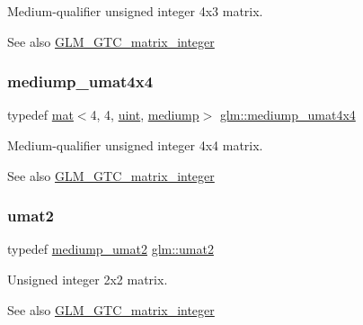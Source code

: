 Medium-\/qualifier unsigned integer 4x3 matrix. \begin{DoxySeeAlso}{See also}
\hyperlink{group__gtc__matrix__integer}{G\+L\+M\+\_\+\+G\+T\+C\+\_\+matrix\+\_\+integer} 
\end{DoxySeeAlso}
\mbox{\label{group__gtc__matrix__integer_ga0dcca70aa643639489cf52acf7574e6c}} 
\subsubsection{\texorpdfstring{mediump\+\_\+umat4x4}{mediump\_umat4x4}}
{\footnotesize\ttfamily typedef \hyperlink{structglm_1_1mat}{mat}$<$4, 4, \hyperlink{group__core__precision_ga4fd29415871152bfb5abd588334147c8}{uint}, \hyperlink{namespaceglm_a36ed105b07c7746804d7fdc7cc90ff25a6416f3ea0c9025fb21ed50c4d6620482}{mediump}$>$ \hyperlink{group__gtc__matrix__integer_ga0dcca70aa643639489cf52acf7574e6c}{glm\+::mediump\+\_\+umat4x4}}

Medium-\/qualifier unsigned integer 4x4 matrix. \begin{DoxySeeAlso}{See also}
\hyperlink{group__gtc__matrix__integer}{G\+L\+M\+\_\+\+G\+T\+C\+\_\+matrix\+\_\+integer} 
\end{DoxySeeAlso}
\mbox{\label{group__gtc__matrix__integer_gae2d45c058cfa0b60ab4df0cdda2d8516}} 
\subsubsection{\texorpdfstring{umat2}{umat2}}
{\footnotesize\ttfamily typedef \hyperlink{group__gtc__matrix__integer_gaafd6d236ce051d138e3fdf53de3813e6}{mediump\+\_\+umat2} \hyperlink{group__gtc__matrix__integer_gae2d45c058cfa0b60ab4df0cdda2d8516}{glm\+::umat2}}

Unsigned integer 2x2 matrix. \begin{DoxySeeAlso}{See also}
\hyperlink{group__gtc__matrix__integer}{G\+L\+M\+\_\+\+G\+T\+C\+\_\+matrix\+\_\+integer} 
\end{DoxySeeAlso}
\mbox{\label{group__gtc__matrix__integer_gad3c997b31dd69bdb4787867e758ed48d}} 
